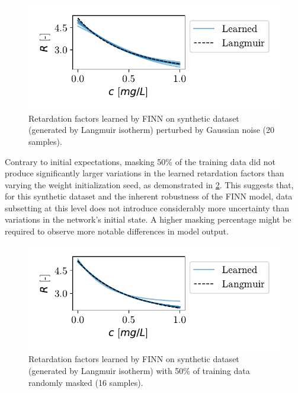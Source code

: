 \begin{figure}[h]
    \centering
    \includegraphics{figs/finn_synthetic_SPAN_noise.pdf}
    \caption{Retardation factors learned by FINN on synthetic dataset (generated by Langmuir isotherm) perturbed by Gaussian noise (20 samples).}
    \label{fig:synthetic_SPAN_noise}
\end{figure}


Contrary to initial expectations, masking 50\% of the training data did not produce significantly larger variations in the learned retardation factors than varying the weight initialization seed, as demonstrated in \cref{fig:synthetic_SPAN_losspattern}. This suggests that, for this synthetic dataset and the inherent robustness of the FINN model, data subsetting at this level does not introduce considerably more uncertainty than variations in the network's initial state. A higher masking percentage might be required to observe more notable differences in model output.

\begin{figure}[h]
    \centering
    \includegraphics{figs/finn_synthetic_SPAN_losspattern.pdf}
    \caption{Retardation factors learned by FINN on synthetic dataset (generated by Langmuir isotherm) with 50\% of training data randomly masked (16 samples).}
    \label{fig:synthetic_SPAN_losspattern}
\end{figure}




